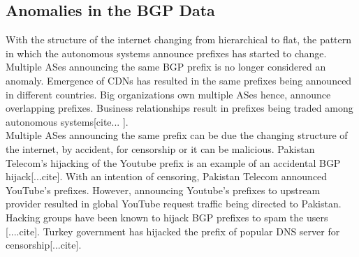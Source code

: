 \subsection{Anomalies in the BGP Data}
With the structure of the internet changing from hierarchical to flat, the pattern in which the autonomous systems announce prefixes has started to change. Multiple ASes announcing the same BGP prefix is no longer considered an anomaly. Emergence of CDNs has resulted in the same prefixes being announced in different countries. Big organizations own multiple ASes hence, announce overlapping prefixes. Business relationships result in prefixes being traded among autonomous systems[cite... ]. \\
Multiple ASes announcing the same prefix can be due the changing structure of the internet, by accident, for censorship or it can be malicious. Pakistan Telecom's hijacking of the Youtube prefix is an example of an accidental BGP hijack[...cite].  With an intention of censoring, Pakistan Telecom announced YouTube's prefixes. However, announcing Youtube's prefixes to upstream provider resulted in global YouTube request traffic being directed to Pakistan. Hacking groups have been known to hijack BGP prefixes to spam the users [....cite]. Turkey government has hijacked the prefix of popular DNS server for censorship[...cite].
   